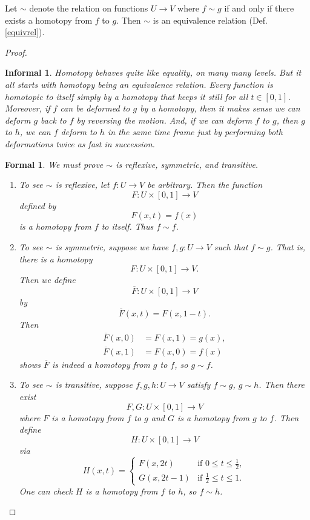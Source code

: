 \documentclass{amsart}
\newtheorem*{formal}{Formal}
\newtheorem*{informal}{Informal}
\begin{document}
\begin{proposition}
	Let \(\sim\) denote the relation on functions \(U\to V\) where \(f\sim g\)
	if and only if there exists a homotopy from \(f\) to \(g\). Then \(\sim\) is
	an equivalence relation (Def. \ref{equivrel}).
\end{proposition}
\begin{proof}
	\begin{informal}
	   Homotopy behaves quite like equality, on many many levels. But it all
		starts with homotopy being an equivalence relation. Every function is
		homotopic to itself simply by a homotopy that keeps it still for all
		\(t\in[0, 1]\). Moreover, if \(f\) can be deformed to \(g\) by a
		homotopy, then it makes sense we can deform \(g\) back to \(f\) by
		reversing the motion. And, if we can deform \(f\) to \(g\), then \(g\) to
		\(h\), we can  \(f\) deform to \(h\) in the same time frame just by
		performing both deformations twice as fast in succession.
	\end{informal}

	\begin{formal} 
   We must prove \(\sim\) is reflexive, symmetric, and transitive.
	\begin{enumerate}[label=(\roman*)]
		\item To see \(\sim\) is reflexive, let \(f: U\to V\) be arbitrary. Then
		the function 
		\[
			F: U\times [0, 1]\to V
		\]
		defined by 
		\[
		   F(x, t) = f(x)
		\]
		is a homotopy from \(f\) to itself. Thus \(f\sim f\).

		\item To see \(\sim\) is symmetric, suppose we have \(f, g: U\to V\) such
		that \(f\sim g\). That is, there is
		a homotopy 
		\[
			F: U\times [0, 1]\to V.
		\] 
		Then we define 
		\[
			\overline{F}: U\times [0, 1]\to V
		\]
		by
		\[
		   \overline{F}(x, t) = F(x, 1-t).
		\] 
		Then
		\begin{align*}
			\overline{F}(x, 0) &= F(x, 1) = g(x),\\
			\overline{F}(x, 1) &= F(x, 0) = f(x)
		\end{align*}
		shows \(\overline{F}\) is indeed a homotopy from \(g\) to
		\(f\), so \(g\sim f\).

		\item To see \(\sim\) is transitive, suppose \(f, g, h: U\to V\) satisfy
		\(f\sim g\), \(g\sim h\). Then there exist 
		\[
			F, G: U\times [0, 1]\to V
		\]
		where \(F\) is a homotopy from \(f\) to \(g\) and \(G\) is a homotopy
		from \(g\) to \(f\). Then define 
		\[
			H: U\times [0, 1]\to V
		\]
		via
		\[
		   H(x, t) = 
			\begin{cases}
				F(x, 2t) &\text{if } 0\le t\le \frac{1}{2},\\
				G(x, 2t-1) & \text{if } \frac{1}{2}\le t\le 1.
		   \end{cases}
		\] 
		One can check \(H\) is a homotopy from \(f\) to \(h\), so \(f\sim h\).
	\end{enumerate}
\end{formal}
\end{proof}
\end{document}

